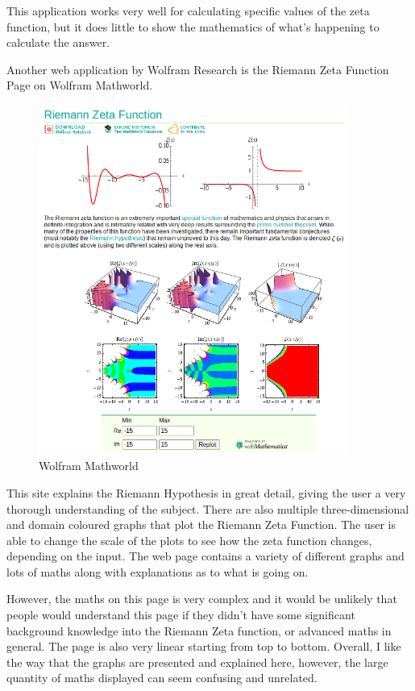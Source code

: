 \documentclass[12pt]{article}
\begin{document}
This application works very well for calculating specific values of the zeta function, but it does little to show the mathematics of what’s happening to calculate the answer.
\clearpage

Another web application by Wolfram Research is the Riemann Zeta Function Page on Wolfram Mathworld.

\begin{figure}[ht]
    \centering
    \captionsetup{justification=centering}
    \includegraphics[width=4in]{wolfram-mathworld}
    \caption{Wolfram Mathworld}
\end{figure}

This site explains the Riemann Hypothesis in great detail, giving the user a very thorough understanding of the subject. There are also multiple three-dimensional and domain coloured graphs that plot the Riemann Zeta Function. The user is able to change the scale of the plots to see how the zeta function changes, depending on the input. The web page contains a variety of different graphs and lots of maths along with explanations as to what is going on.

However, the maths on this page is very complex and it would be unlikely that people would understand this page if they didn't have some significant background knowledge into the Riemann Zeta function, or advanced maths in general. The page is also very linear starting from top to bottom. Overall, I like the way that the graphs are presented and explained here, however, the large quantity of maths displayed can seem confusing and unrelated.
\end{document}
